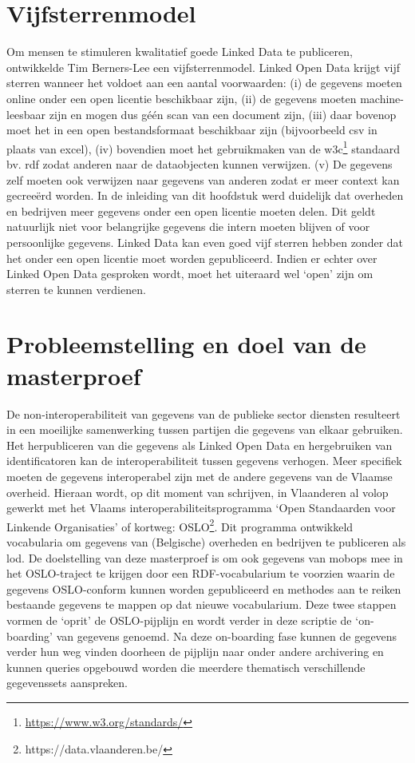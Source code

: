 \section{Vijfsterrenmodel}
\label{sec:linked_open_data}
Om mensen te stimuleren kwalitatief goede Linked Data te publiceren, ontwikkelde Tim Berners-Lee een vijfsterrenmodel. 
Linked Open Data krijgt vijf sterren wanneer het voldoet aan een aantal voorwaarden: (i) de gegevens moeten online onder een open licentie beschikbaar zijn, (ii) de gegevens moeten machine-leesbaar zijn en mogen dus géén scan van een document zijn, (iii) daar bovenop moet het in een open bestandsformaat beschikbaar zijn (bijvoorbeeld csv in plaats van excel), (iv) bovendien moet het gebruikmaken van de w3c\footnote{\url{https://www.w3.org/standards/}} standaard bv. \acrfull{rdf} zodat anderen naar de dataobjecten kunnen verwijzen. (v) De gegevens zelf moeten ook verwijzen naar gegevens van anderen zodat er meer context kan gecreeërd worden.
In de inleiding van dit hoofdstuk werd duidelijk dat overheden en bedrijven meer gegevens onder een open licentie moeten delen. Dit geldt natuurlijk niet voor belangrijke gegevens die intern moeten blijven of voor persoonlijke gegevens. Linked Data kan even goed vijf sterren hebben zonder dat het onder een open licentie moet worden gepubliceerd. Indien er echter over Linked Open Data gesproken wordt, moet het uiteraard wel `open' zijn om sterren te kunnen verdienen.

\section{Probleemstelling en doel van de masterproef}
\label{sec:problem}
De non-interoperabiliteit van gegevens van de publieke sector diensten resulteert in een moeilijke samenwerking tussen partijen die gegevens van elkaar gebruiken. 
Het herpubliceren van die gegevens als Linked Open Data en hergebruiken van identificatoren kan de interoperabiliteit tussen gegevens verhogen.
Meer specifiek moeten de gegevens interoperabel zijn met de andere gegevens van de Vlaamse overheid. 
Hieraan wordt, op dit moment van schrijven, in Vlaanderen al volop gewerkt met het Vlaams interoperabiliteitsprogramma `Open Standaarden voor Linkende Organisaties' of kortweg: OSLO\footnote{https://data.vlaanderen.be/}. 
Dit programma ontwikkeld vocabularia om gegevens van (Belgische) overheden en bedrijven te publiceren als \acrshort{lod}. 
De doelstelling van deze masterproef is om ook gegevens van \glspl{mobop} mee in het OSLO-traject te krijgen door een RDF-vocabularium te voorzien waarin de gegevens OSLO-conform kunnen worden gepubliceerd en methodes aan te reiken bestaande gegevens te mappen op dat nieuwe vocabularium.
Deze twee stappen vormen de `oprit' de OSLO-pijplijn en wordt verder in deze scriptie de `on-boarding' van gegevens genoemd. Na deze on-boarding fase kunnen de gegevens verder hun weg vinden doorheen de pijplijn naar onder andere archivering en kunnen 
queries opgebouwd worden die meerdere thematisch verschillende gegevenssets aanspreken.

